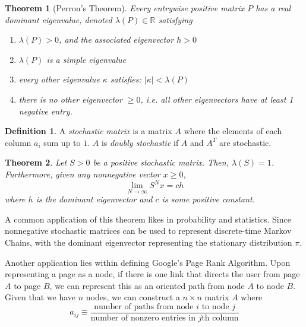 \documentclass{article}
\newtheorem{theorem}{Theorem}[section]
\theoremstyle{remark}
\theoremstyle{definition}
\newtheorem{definition}{Definition}[section]
\begin{document}
\begin{theorem}[Perron's Theorem]
Every entrywise positive matrix $P$ has a real \textit{dominant eigenvalue}, denoted $\lambda(P) \in \mathbb{R}$ satisfying
\begin{enumerate}
    \item $\lambda(P) > 0$, and the associated eigenvector $h >0$
    \item $\lambda(P)$ is a simple eigenvalue
    \item every other eigenvalue $\kappa$ satisfies: $|\kappa| < \lambda(P)$
    \item there is no other eigenvector $\geq 0$, i.e. all other eigenvectors have at least 1 negative entry.
\end{enumerate}
\end{theorem}

\begin{definition}
A \textit{stochastic matrix} is a matrix $A$ where the elements of each column $a_i$ sum up to $1$. $A$ is \textit{doubly stochastic} if $A$ and $A^T$ are stochastic. 
\end{definition}

\begin{theorem}
Let $S > 0$ be a positive stochastic matrix. Then, $\lambda(S) = 1$. Furthermore, given any nonnegative vector $x \geq 0$, 
\[\lim_{N \rightarrow \infty} S^N x = c h\]
where $h$ is the dominant eigenvector and $c$ is some positive constant. 
\end{theorem}

A common application of this theorem likes in probability and statistics. Since nonnegative stochastic matrices can be used to represent discrete-time Markov Chains, with the dominant eigenvector representing the stationary distribution $\pi$. 

Another application lies within defining Google's Page Rank Algorithm. Upon representing a page as a node, if there is one link that directs the user from page $A$ to page $B$, we can represent this as an oriented path from node $A$ to node $B$. Given that we have $n$ nodes, we can construct a $n \times n$ matrix $A$ where 
\[a_{i j} \equiv  \frac{\text{number of paths from node $i$ to node $j$}}{\text{number of nonzero entries in $j$th column}}\]
\end{document}
